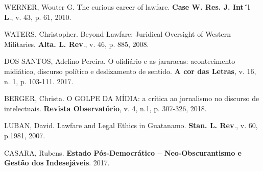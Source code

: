 WERNER, Wouter G. The curious career of lawfare. \textbf{Case W. Res. J.
Int´l L}., v. 43, p. 61, 2010.

WATERS, Christopher. Beyond Lawfare: Juridical Oversight of Western
Militaries. \textbf{Alta. L. Rev}., v. 46, p. 885, 2008.

DOS SANTOS, Adelino Pereira. O ofidiário e as jararacas: acontecimento
midiático, discurso político e deslizamento de sentido. \textbf{A cor
das Letras}, v. 16, n. 1, p. 103-111. 2017.

BERGER, Christa. O GOLPE DA MÍDIA: a crítica ao jornalismo no discurso
de intelectuais. \textbf{Revista Observatório}, v. 4, n.1, p. 307-326,
2018.

LUBAN, David. Lawfare and Legal Ethics in Guatanamo. \textbf{Stan. L.
Rev}., v. 60, p.1981, 2007.

CASARA, Rubens. \textbf{Estado Pós-Democrático -- Neo-Obscurantismo e
Gestão dos Indesejáveis}. 2017.
